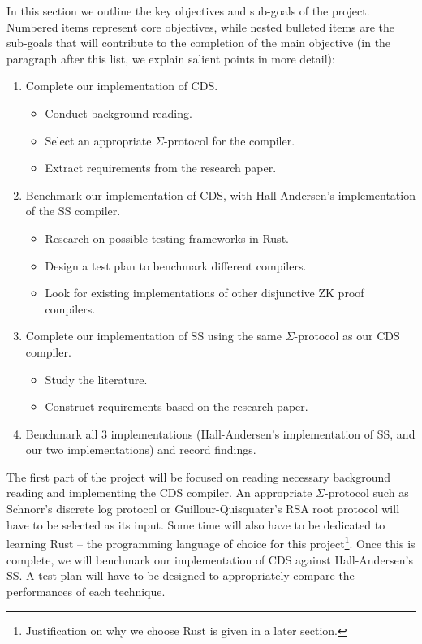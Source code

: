 \documentclass[a4paper,fleqn,12pt]{article}
\begin{document}
In this section we outline the key objectives and sub-goals of the project. Numbered items represent core objectives, while nested bulleted items are the sub-goals that will contribute to the completion of the main objective (in the paragraph after this list, we explain salient points in more detail):
\begin{enumerate}
    \item Complete our implementation of CDS.
    \begin{itemize}
        \item Conduct background reading.
        \item Select an appropriate $\Sigma$-protocol for the compiler.
        \item Extract requirements from the research paper. 
    \end{itemize}
    \item Benchmark our implementation of CDS, with Hall-Andersen's implementation \cite{MHAStackSig} of the SS compiler.
    \begin{itemize}
        \item Research on possible testing frameworks in Rust. 
        \item Design a test plan to benchmark different compilers. 
        \item Look for existing implementations of other disjunctive ZK proof compilers.
    \end{itemize}
    \item Complete our implementation of SS using the same $\Sigma$-protocol as our CDS compiler.
    \begin{itemize}
        \item Study the literature.
        \item Construct requirements based on the research paper.
    \end{itemize}
    \item Benchmark all 3 implementations (Hall-Andersen's implementation of SS, and our two implementations) and record findings.
\end{enumerate}
The first part of the project will be focused on reading necessary background reading and implementing the CDS compiler. An appropriate $\Sigma$-protocol such as Schnorr's discrete log protocol \cite{Schnorr} or Guillour-Quisquater's RSA root protocol \cite{Guillou1988APZ} will have to be selected as its input. Some time will also have to be dedicated to learning Rust -- the programming language of choice for this project\footnote{Justification on why we choose Rust is given in a later section.}. Once this is complete, we will benchmark our implementation of CDS against Hall-Andersen's SS. A test plan will have to be designed to appropriately compare the performances of each technique.
\end{document}
